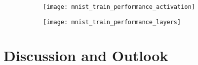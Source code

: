 \documentclass{scrreprt}
\begin{document}
\begin{figure}
	\centering
	\begin{subfigure}[H]{0.5\textwidth}
		\texttt{[image: mnist\_train\_performance\_activation]}
	\end{subfigure}%
	\hfill
	\begin{subfigure}[H]{0.5\textwidth}
		\texttt{[image: mnist\_train\_performance\_layers]}
	\end{subfigure}
\end{figure}

\chapter{Discussion and Outlook}
\end{document}

